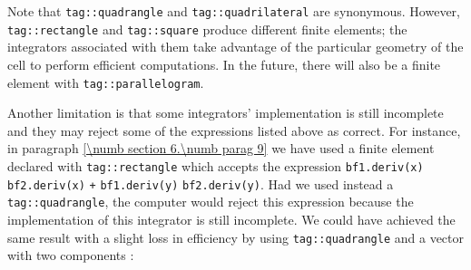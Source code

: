 Note that {\small\tt\textcolor{tag}{tag}::quadrangle} and
{\small\tt\textcolor{tag}{tag}::quadrilateral} are synonymous.
However, {\small\tt\textcolor{tag}{tag}::rectangle} and {\small\tt\textcolor{tag}{tag}::square}
produce different finite elements; the integrators associated with them take advantage of
the particular geometry of the cell to perform efficient computations.
In the future, there will also be a finite element with
{\small\tt\textcolor{tag}{tag}::parallelogram}.

Another limitation is that some integrators' implementation is still incomplete and they may
reject some of the expressions listed above as correct.
For instance, in paragraph \ref{\numb section 6.\numb parag 9} we have used a finite element
declared with {\small\tt\textcolor{tag}{tag}::rectangle} which accepts the expression
{\small\tt bf1.deriv(x)} {\small\tt *} {\small\tt bf2.deriv(x)}
{\small\tt +} {\small\tt bf1.deriv(y)} {\small\tt *} {\small\tt bf2.deriv(y)}.
Had we used instead a {\small\tt\textcolor{tag}{tag}::quadrangle}, the computer would
reject this expression because the implementation of this integrator is still incomplete.
We could have achieved the same result with a slight loss in efficiency by using
{\small\tt\textcolor{tag}{tag}::quadrangle} and a vector {\small\tt{}} with two
components :

